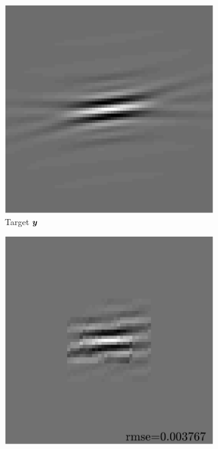 \begin{figure}[!ht]\centering
	\begin{subfigure}[b]{0.22\textwidth}\centering
	\includegraphics[width=\textwidth]{figures/xp/tilted_n4/xp_128x128_sc2_angl4_K3_S3_node4_target.pdf}
	\caption{Target $\bm{y}$}
	\end{subfigure}
	\begin{subfigure}[b]{0.22\textwidth}\centering
	\includegraphics[width=\textwidth]{figures/xp/tilted_n4/xp_128x128_sc2_angl4_K3_S3_node4_approx.pdf}

\end{subfigure}
\end{figure}

